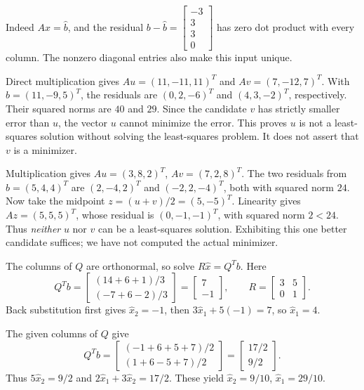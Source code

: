Indeed $A\widehat x=\widehat b$, and the residual $b-\widehat b=\begin{bmatrix}-3\\3\\3\\0\end{bmatrix}$ has zero dot product with every column. The nonzero diagonal entries also make this input unique.


Direct multiplication gives $Au=(11,-11,11)^T$ and
$Av=(7,-12,7)^T$. With $b=(11,-9,5)^T$, the residuals
are $(0,2,-6)^T$ and $(4,3,-2)^T$, respectively. Their squared
norms are $40$ and $29$. Since the candidate $v$ has strictly
smaller error than $u$, the vector $u$ cannot minimize the error.
This proves $u$ is not a least-squares solution without solving the
least-squares problem. It does not assert that $v$ is a minimizer.

Multiplication gives $Au=(3,8,2)^T$, $Av=(7,2,8)^T$.
The two residuals from $b=(5,4,4)^T$ are $(2,-4,2)^T$ and
$(-2,2,-4)^T$, both with squared norm $24$.
Now take the midpoint $z=(u+v)/2=(5,-5)^T$. Linearity gives
$Az=(5,5,5)^T$, whose residual is $(0,-1,-1)^T$, with squared
norm $2<24$. Thus \emph{neither} $u$ nor $v$ can be a least-squares
solution. Exhibiting this one better candidate suffices; we have not
computed the actual minimizer.

The columns of $Q$ are orthonormal, so solve $R\widehat x=Q^Tb$.
Here
\[
 Q^Tb=\begin{bmatrix}(14+6+1)/3\\(-7+6-2)/3\end{bmatrix}
 =\begin{bmatrix}7\\-1\end{bmatrix},\qquad
 R=\begin{bmatrix}3&5\\0&1\end{bmatrix}.
\]
Back substitution first gives $\widehat x_2=-1$, then
$3\widehat x_1+5(-1)=7$, so $\widehat x_1=4$.

The given columns of $Q$ give
\[
 Q^Tb=\begin{bmatrix}(-1+6+5+7)/2\\(1+6-5+7)/2\end{bmatrix}
 =\begin{bmatrix}17/2\\9/2\end{bmatrix}.
\]
Thus $5\widehat x_2=9/2$ and
$2\widehat x_1+3\widehat x_2=17/2$. These yield
$\widehat x_2=9/10$, $\widehat x_1=29/10$.

